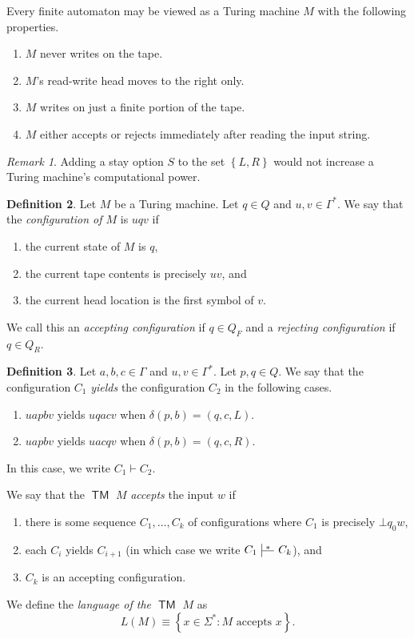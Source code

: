 \documentclass[10pt,letterpaper,cm]{nupset}
\theoremstyle{definition}
\newtheorem{definition}{Definition}[subsection]
\theoremstyle{theorem}
\theoremstyle{remark}
\newtheorem{remark}[definition]{Remark}
\def\ruleoffset{1pt}
\newcommand\specialvdash[2]{\mathrel{\ensurestackMath{
  \mkern2mu\rule[-\dp\strutbox]{.4pt}{\baselineskip}\stackon[\ruleoffset]{
    \stackunder[\dimexpr\ruleoffset-.4\ht\strutbox+.4\dp\strutbox]{
      \rule[\dimexpr.4\ht\strutbox-.4\dp\strutbox]{2.5ex}{.4pt}}{
        \scriptstyle #1}}{\scriptstyle#2}\mkern2mu}}
}
\newcommand{\1}{\mathbf{1}}
\newcommand{\0}{\vec 0}
\DeclareMathOperator{\TM}{\mathsf{TM}}
\begin{document}
Every finite automaton may be viewed as a Turing machine $M$ with the following properties. 
\begin{enumerate}[label=(\alph*)]
\item $M$ never writes on the tape.
\item $M$'s read-write head moves to the right only.
\item $M$ writes on just a finite portion of the tape.
\item $M$ either accepts or rejects immediately after reading the input string. 
\end{enumerate}


\begin{remark}
Adding a stay option $S$ to the set $\left\{L, R\right\}$ would not increase a Turing machine's computational power.
\end{remark}

\begin{definition}
Let $M$ be a Turing machine. Let $q\in Q$ and $u,v\in \Gamma^{\ast}$. We say that the \textit{configuration of $M$} is $uqv$ if 
\begin{enumerate}[label=(\alph*)]
\item the current state of $M$ is $q$,
\item the current tape contents is precisely $uv$, and
\item the current head location is the first symbol of $v$.
\end{enumerate}
We call this an \textit{accepting configuration} if $q \in Q_F$ and a \textit{rejecting configuration} if $q \in Q_R$.
\end{definition}

\begin{definition}
Let $a,b,c\in \Gamma$ and $u,v\in \Gamma^{\ast}$. Let $p,q\in Q$. We say that the configuration $C_1$ \textit{yields} the configuration $C_2$ in the following cases.
\begin{enumerate}[label=(\alph*)]
\item $uapbv$ yields $uqacv$ when $\delta(p,b) = \left(q, c, L\right)$.
\item $uapbv$ yields $uacqv$ when $\delta(p, b) = \left(q, c, R\right)$. 
\end{enumerate}
In this case, we write $C_1 \vdash C_2$.
\end{definition}

\medskip

We say that the $\TM$ $M$ \textit{accepts} the input $w$ if 
\begin{enumerate}[label=(\roman*)]
\item there is some sequence $C_1, \ldots, C_k$ of configurations where $C_1$ is precisely  $\bot q_0w$, 
\item each $C_i$ yields $C_{i+1}$ (in which case we write $C_1 \specialvdash{}{*} C_k$), and
\item $C_k$ is an accepting configuration. 
\end{enumerate}
We define the \textit{language of the $\TM$ $M$} as $$L(M) \equiv \left\{x \in \Sigma^{\ast}: M \text{ accepts } x \right\}.$$
\end{document}
